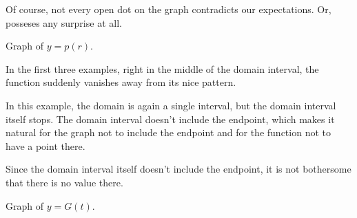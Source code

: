 \documentclass{ximera}
\begin{document}
Of course, not every open dot on the graph contradicts our expectations. Or, posseses any surprise at all.






Graph of $y = p(r)$.

\begin{image}
\end{image}








In the first three examples, right in the middle of the domain interval, the function suddenly vanishes away from its nice pattern. 

In this example, the domain is again a single interval, but the domain interval itself stops. The domain interval doesn’t include the endpoint, which makes it natural for the graph not to include the endpoint and for the function not to have a point there.

Since the domain interval itself doesn't include the endpoint, it is not bothersome that there is no value there.








 
Graph of $y = G(t)$.
 
\end{document}
